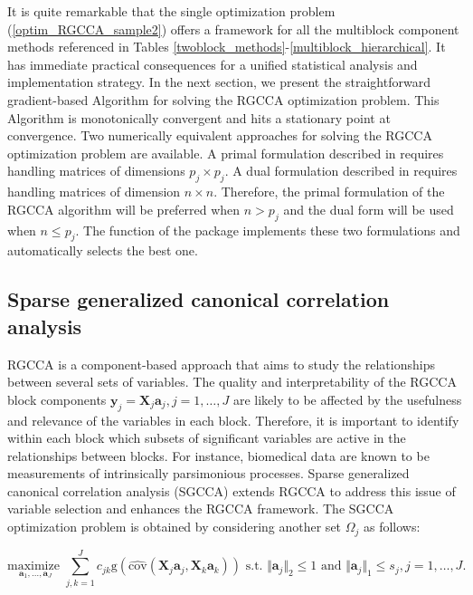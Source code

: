\documentclass[
]{jss}
\begin{document}
It is quite remarkable that the single optimization problem
(\ref{optim_RGCCA_sample2}) offers a framework for all the multiblock
component methods referenced in Tables
\ref{twoblock_methods}-\ref{multiblock_hierarchical}. It has immediate
practical consequences for a unified statistical analysis and
implementation strategy. In the next section, we present the
straightforward gradient-based Algorithm for solving the RGCCA
optimization problem. This Algorithm is monotonically convergent and
hits a stationary point at convergence. Two numerically equivalent
approaches for solving the RGCCA optimization problem are available. A
primal formulation described in \cite{Tenenhaus2011, Tenenhaus2017}
requires handling matrices of dimensions \(p_j \times p_j\). A dual
formulation described in \cite{Tenenhaus2015} requires handling matrices
of dimension \(n \times n\). Therefore, the primal formulation of the
RGCCA algorithm will be preferred when \(n>p_j\) and the dual form will
be used when \(n \le p_j\). The  function of the
 package implements these two formulations and automatically
selects the best one.

\hypertarget{sparse-generalized-canonical-correlation-analysis}{%
\subsection{Sparse generalized canonical correlation
analysis}\label{sparse-generalized-canonical-correlation-analysis}}

RGCCA is a component-based approach that aims to study the relationships
between several sets of variables. The quality and interpretability of
the RGCCA block components
\(\mathbf{y}_j= \mathbf{X}_j \mathbf{a}_j,j=1, \ldots,J\) are likely to
be affected by the usefulness and relevance of the variables in each
block. Therefore, it is important to identify within each block which
subsets of significant variables are active in the relationships between
blocks. For instance, biomedical data are known to be measurements of
intrinsically parsimonious processes. Sparse generalized canonical
correlation analysis (SGCCA) extends RGCCA to address this issue of
variable selection \citep{Tenenhaus2014b} and enhances the RGCCA
framework. The SGCCA optimization problem is obtained by considering
another set \(\Omega_j\) as follows:

\begin{equation}
\displaystyle \underset{\mathbf{a}_1, \ldots,\mathbf{a}_J}{\text{maximize }} \sum_{j, k = 1}^J c_{jk}\text{g}\left(\widehat{\text{cov}}\left(\mathbf{X}_j\mathbf{a}_j, \mathbf{X}_k\mathbf{a}_k\right)\right) \text{ s.t. } \Vert \mathbf{a}_j \Vert_2 \le 1 \text{ and } \Vert \mathbf{a}_j \Vert_1 \le s_j, j=1,\ldots,J.
\label{optim_SGCCA}
\end{equation}
\end{document}
